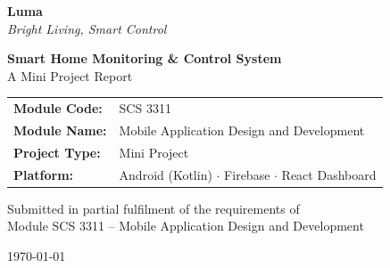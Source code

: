 \documentclass[11pt,a4paper]{article}
\title{\vspace{-1cm}}
\date{}
\begin{document}
\begin{titlepage}
\centering
\vspace*{1.2cm}

{\Huge\bfseries\color{lumasecondary} Luma}\\[0.3cm]
{\Large\itshape\color{lumaprimary} Bright Living, Smart Control}\\[1.2cm]


\vspace{0.8cm}
{\LARGE\bfseries Smart Home Monitoring \& Control System}\\[0.4cm]
{\large A Mini Project Report}\\[1.6cm]

\begin{tabular}{ll}
\textbf{Module Code:} & SCS 3311 \\[4pt]
\textbf{Module Name:} & Mobile Application Design and Development \\[4pt]
\textbf{Project Type:} & Mini Project \\[4pt]
\textbf{Platform:} & Android (Kotlin) $\cdot$ Firebase $\cdot$ React Dashboard \\[4pt]
\end{tabular}

\vspace{1.8cm}


\begin{minipage}{0.85\linewidth}
\centering
{}
\end{minipage}

\vfill

{\large Submitted in partial fulfilment of the requirements of\\
Module SCS 3311 -- Mobile Application Design and Development}

\vspace{0.6cm}
{\large \today}

\end{titlepage}
\end{document}
